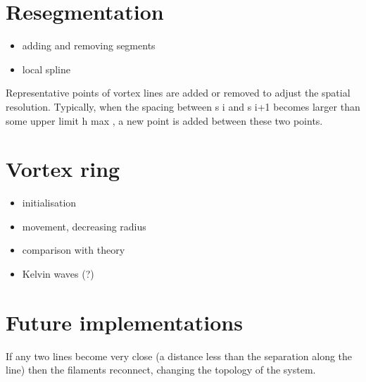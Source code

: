 \section{Resegmentation}
\begin{itemize}
	\item adding and removing segments
	\item local spline
\end{itemize}

Representative points of vortex lines are added or removed to adjust the spatial
resolution. Typically, when the spacing between s i and s i+1 becomes larger than some
upper limit h max , a new point is added between these two points.

\section{Vortex ring}
\begin{itemize}
	\item initialisation
	\item movement, decreasing radius
	\item comparison with theory
	\item Kelvin waves (?)
\end{itemize}

\section{Future implementations}

If any two lines become very close (a distance less than the separation along the line) then the filaments reconnect, changing the topology of the system.

\newpage
